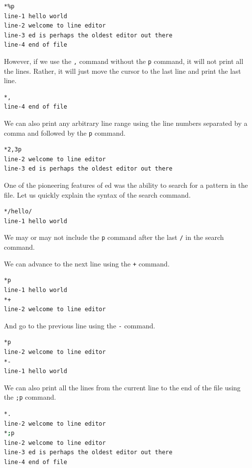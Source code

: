 \begin{lstlisting}[language=bash]
*%p
line-1 hello world
line-2 welcome to line editor
line-3 ed is perhaps the oldest editor out there
line-4 end of file
\end{lstlisting}

However, if we use the \texttt{,} command without
the \texttt{p} command, it will not print all the lines.
Rather, it will just move the cursor to the last line
and print the last line.

\begin{lstlisting}[language=bash]
*,
line-4 end of file
\end{lstlisting}

We can also print any arbitrary line range
using the line numbers separated by a comma
and followed by the \texttt{p} command.

\begin{lstlisting}[language=bash]
*2,3p
line-2 welcome to line editor
line-3 ed is perhaps the oldest editor out there
\end{lstlisting}

One of the pioneering features of ed was the ability
to search for a pattern in the file. Let us quickly
explain the syntax of the search command.

\begin{lstlisting}[language=bash]
*/hello/
line-1 hello world
\end{lstlisting}

We may or may not include the \texttt{p} command
after the last \texttt{/{}} in the search command.

We can advance to the next line using the \texttt{+} command.

\begin{lstlisting}[language=bash]
*p
line-1 hello world
*+
line-2 welcome to line editor
\end{lstlisting}

And go to the previous line using the \texttt{-} command.


\begin{lstlisting}[language=bash]
*p
line-2 welcome to line editor
*-
line-1 hello world
\end{lstlisting}

We can also print all the lines from the current line
to the end of the file using the \texttt{;p} command.

\begin{lstlisting}[language=bash]
*.
line-2 welcome to line editor
*;p
line-2 welcome to line editor
line-3 ed is perhaps the oldest editor out there
line-4 end of file
\end{lstlisting}

